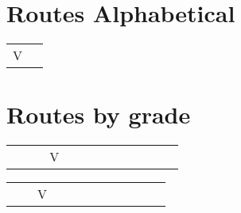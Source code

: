 \twocolumn
{}
\begin{flushleft}
\section{Routes Alphabetical}
\begin{center}
\begin{supertabular}{p{0.65\linewidth}r}
 V &  \\
\end{supertabular}
\end{center}
\section{Routes by grade}
\begin{center}
\begin{supertabular}{p{0.18\linewidth}p{0.13\linewidth}p{0.45\linewidth}p{0.08\linewidth}}
 &V& &  \\
\end{supertabular}
\begin{supertabular}{p{0.13\linewidth}p{0.18\linewidth}p{0.45\linewidth}p{0.08\linewidth}}
&V& &  \\
\end{supertabular}
\end{center}
\end{flushleft}
\onecolumn
\clearpage